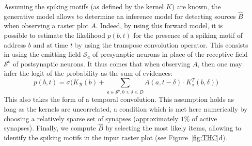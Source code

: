 \documentclass[runningheads]{llncs}
\newcommand{\presynaddr}{a} %
\newcommand{\postsynaddr}{b} %
\newcommand{\postsynaddrspace}{\mathcal{B}} %
\newcommand{\synapse}{\mathcal{S}} %
\newcommand{\synapticdelay}{\delta} %
\newcommand{\ranksyn}{s} %
\newcommand{\timev}{t} %
\newcommand{\kernel}{K} %
\newcommand{\fig}[1]{Fig.~\ref{fig:#1}}%
\begin{document}
%
%
%
%
%
%
%


% 
Assuming the spiking motifs (as defined by the kernel $\kernel$) are known, the generative model allows to determine an inference model for detecting sources $\hat{B}$ when observing a raster plot $A$. Indeed, by using this forward model, it is possible to estimate the likelihood $p(b, t)$ for the presence of a spiking motif of address $b$ and at time $t$ by using the transpose convolution operator. This consists in using the emitting field $\synapse_\presynaddr$ of presynaptic neurons in place of the receptive field $\synapse^\postsynaddr$ of postsynaptic neurons. It thus comes that when observing $A$, then one may infer the logit of the probability as the sum of evidences:
\begin{equation*}
  p(\postsynaddr, t) = \sigma\big(\kernel_\postsynaddrspace(b) + \sum_{\presynaddr \in \synapse^\postsynaddr,  0 \le \synapticdelay \le D} A(\presynaddr, t-\synapticdelay) \cdot \kernel^T_\presynaddr(\postsynaddr, \synapticdelay) \big)  
\end{equation*}
This also takes the form of a temporal convolution. This assumption holds as long as the kernels are uncorrelated, a condition which is met here numerically by choosing a relatively sparse set of synapses (approximately $1\%$ of active synapses). Finally, we compute $\hat{B}$ by selecting the most likely items, allowing to identify the spiking motifs in the input raster plot (see Figure~\ref{fig:THC}d). 
\end{document}
